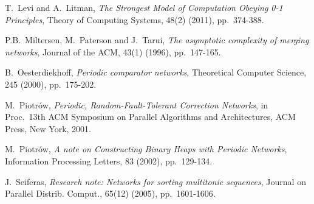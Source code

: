\documentclass{llncs}
\begin{document}
\begin{thebibliography}{99}
 {\sc  T.~Levi and A.~Litman}, {\em The Strongest Model of 
Computation Obeying 0-1 Principles}, Theory of Computing Systems, 48(2) 
(2011), pp.~374-388.

 {\sc P.B.~Miltersen, M.~Paterson and J.~Tarui}, {\em The 
asymptotic complexity of merging networks}, Journal of the ACM, 43(1) (1996), 
pp.~147-165.

 {\sc B.~Oesterdiekhoff}, {\em Periodic comparator networks},
  Theoretical Computer Science, 245 (2000), pp.~175-202.

 {\sc M.~Piotr{\'o}w}, {\em Periodic, Random-Fault-Tolerant
  Correction Networks}, in Proc.\ 13th ACM Symposium on Parallel
  Algorithms and Architectures, ACM Press, New York, 2001.

 {\sc M.~Piotr{\'o}w}, {\em A note on Constructing Binary
  Heaps with Periodic Networks}, Information Processing Letters, 83
  (2002), pp.~129-134.

 {\sc J.~Seiferas}, {\em Research note: Networks for sorting 
multitonic sequences}, Journal on Parallel Distrib. Comput., 65(12) (2005), 
pp.~1601-1606.

\end{thebibliography}
\end{document}
